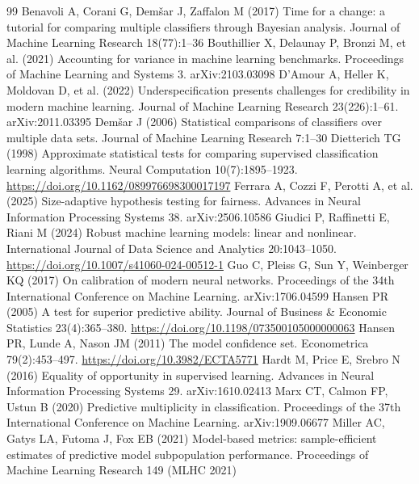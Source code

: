 \documentclass[11pt,a4paper]{article}
\begin{document}
\begin{thebibliography}{99}
 Benavoli A, Corani G, Dem{\v s}ar J, Zaffalon M (2017) Time for a change: a tutorial for comparing multiple classifiers through Bayesian analysis. Journal of Machine Learning Research 18(77):1--36
 Bouthillier X, Delaunay P, Bronzi M, et al. (2021) Accounting for variance in machine learning benchmarks. Proceedings of Machine Learning and Systems 3. arXiv:2103.03098
 D'Amour A, Heller K, Moldovan D, et al. (2022) Underspecification presents challenges for credibility in modern machine learning. Journal of Machine Learning Research 23(226):1--61. arXiv:2011.03395
 Dem{\v s}ar J (2006) Statistical comparisons of classifiers over multiple data sets. Journal of Machine Learning Research 7:1--30
 Dietterich TG (1998) Approximate statistical tests for comparing supervised classification learning algorithms. Neural Computation 10(7):1895--1923. \url{https://doi.org/10.1162/089976698300017197}
 Ferrara A, Cozzi F, Perotti A, et al. (2025) Size-adaptive hypothesis testing for fairness. Advances in Neural Information Processing Systems 38. arXiv:2506.10586
 Giudici P, Raffinetti E, Riani M (2024) Robust machine learning models: linear and nonlinear. International Journal of Data Science and Analytics 20:1043--1050. \url{https://doi.org/10.1007/s41060-024-00512-1}
 Guo C, Pleiss G, Sun Y, Weinberger KQ (2017) On calibration of modern neural networks. Proceedings of the 34th International Conference on Machine Learning. arXiv:1706.04599
 Hansen PR (2005) A test for superior predictive ability. Journal of Business \& Economic Statistics 23(4):365--380. \url{https://doi.org/10.1198/073500105000000063}
 Hansen PR, Lunde A, Nason JM (2011) The model confidence set. Econometrica 79(2):453--497. \url{https://doi.org/10.3982/ECTA5771}
 Hardt M, Price E, Srebro N (2016) Equality of opportunity in supervised learning. Advances in Neural Information Processing Systems 29. arXiv:1610.02413
 Marx CT, Calmon FP, Ustun B (2020) Predictive multiplicity in classification. Proceedings of the 37th International Conference on Machine Learning. arXiv:1909.06677
 Miller AC, Gatys LA, Futoma J, Fox EB (2021) Model-based metrics: sample-efficient estimates of predictive model subpopulation performance. Proceedings of Machine Learning Research 149 (MLHC 2021)

\end{thebibliography}
\end{document}
